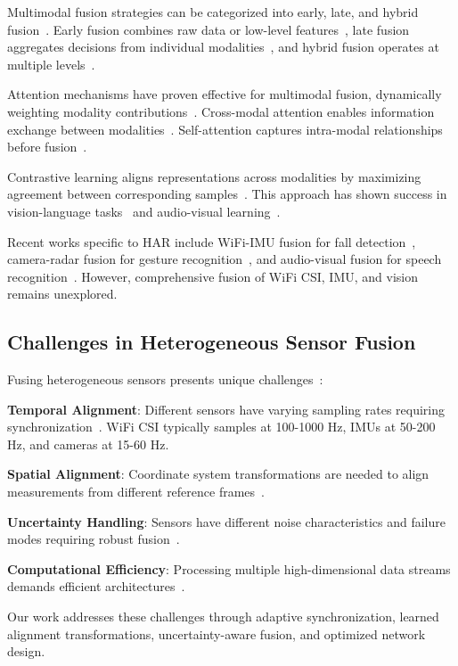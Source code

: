 \documentclass[journal]{IEEEtran}
\begin{document}
Multimodal fusion strategies can be categorized into early, late, and hybrid fusion~\cite{fusion2019survey}. Early fusion combines raw data or low-level features~\cite{early2020}, late fusion aggregates decisions from individual modalities~\cite{late2021}, and hybrid fusion operates at multiple levels~\cite{hybrid2022}.

Attention mechanisms have proven effective for multimodal fusion, dynamically weighting modality contributions~\cite{attention2023multimodal}. Cross-modal attention enables information exchange between modalities~\cite{crossmodal2024}. Self-attention captures intra-modal relationships before fusion~\cite{selfattention2023}.

Contrastive learning aligns representations across modalities by maximizing agreement between corresponding samples~\cite{clip2021, align2022}. This approach has shown success in vision-language tasks~\cite{vlp2023} and audio-visual learning~\cite{audiovisual2024}.

Recent works specific to HAR include WiFi-IMU fusion for fall detection~\cite{fall2023fusion}, camera-radar fusion for gesture recognition~\cite{gesture2024}, and audio-visual fusion for speech recognition~\cite{speech2023av}. However, comprehensive fusion of WiFi CSI, IMU, and vision remains unexplored.

\subsection{Challenges in Heterogeneous Sensor Fusion}

Fusing heterogeneous sensors presents unique challenges~\cite{heterogeneous2024survey}:

\textbf{Temporal Alignment}: Different sensors have varying sampling rates requiring synchronization~\cite{sync2023}. WiFi CSI typically samples at 100-1000 Hz, IMUs at 50-200 Hz, and cameras at 15-60 Hz.

\textbf{Spatial Alignment}: Coordinate system transformations are needed to align measurements from different reference frames~\cite{coordinate2024}.

\textbf{Uncertainty Handling}: Sensors have different noise characteristics and failure modes requiring robust fusion~\cite{uncertainty2023}.

\textbf{Computational Efficiency}: Processing multiple high-dimensional data streams demands efficient architectures~\cite{efficient2024fusion}.

Our work addresses these challenges through adaptive synchronization, learned alignment transformations, uncertainty-aware fusion, and optimized network design.
\end{document}
